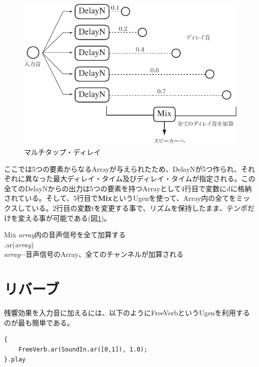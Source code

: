 \documentclass{jsarticle}
\begin{document}
\begin{figure}[htbp]
	\begin{center}
		\includegraphics[scale=0.7]{multitap.pdf}
	\end{center}
	\label{fig:multitap}
	\caption{マルチタップ・ディレイ}
\end{figure}

ここでは5つの要素からなるArrayが与えられたため、DelayNが5つ作られ、それぞれに異なった最大ディレイ・タイム及びディレイ・タイムが指定される。この全てのDelayNからの出力は5つの要素を持つArrayとして4行目で変数にdに格納されている。そして、5行目で{\bf Mix}というUgenを使って、Array内の全てをミックスしている。2行目の変数tを変更する事で、リズムを保持したまま、テンポだけを変える事が可能である(図\ref{fig:multitap})。


\begin{itembox}[l]{Mix}
{\footnotesize 
{\it array}内の音声信号を全て加算する\\
.ar({\it array})\\
{\it array}$\cdots$音声信号のArray、全てのチャンネルが加算される\\
}
\end{itembox}

\section{リバーブ}
残響効果を入力音に加えるには、以下のようにFreeVerbというUgenを利用するのが最も簡単である。

\begin{lstlisting}[caption=リバーブ, label=code:reverb]
{
	FreeVerb.ar(SoundIn.ar([0,1]), 1.0);
}.play
\end{lstlisting}
\end{document}
